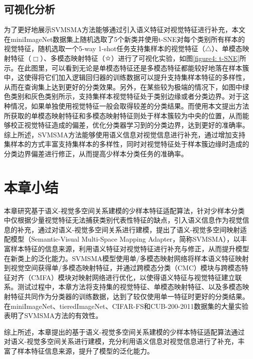 \subsection[\hspace{-2pt}可视化分析]{{\heiti{} \hspace{-8pt}可视化分析}}\label{section4: 可视化分析}

为了更好地展示SVMSMA方法能够通过引入语义特征对视觉特征进行补充，本文在miniImageNet数据集上随机选取了5个新类并使用t-SNE对每个类别所有样本的视觉特征，随机选取一个5-way 1-shot任务支持集样本的视觉特征（$\triangle$）、单模态映射特征（$\Box$）、多模态映射特征（$\hollowstar$）进行了可视化实验，如图\ref{figure4: t-SNE}所示。在此图里，可以看到无论是单模态特征还是多模态特征都能较好地落在样本簇中，这使得将它们加入逻辑回归器的训练数据可以提升支持集样本特征的多样性，从而在查询集上达到更好的分类效果。另外，在某些较为极端的情况下，如图中绿色类别和灰色类别所示，支持集样本视觉特征处于类别边缘或者分类边界。对于这种情况，如果单独使用视觉特征一般会取得较差的分类结果。而使用本文提出方法所获取的单模态映射特征和多模态映射特征则处于样本簇较为中央的位置，从而能够校正视觉特征造成的偏差，优化分类器学习到的分类边界，达到更好的准确率。综上所述，SVMSMA方法能够使用语义信息对视觉信息进行补充，通过增加支持集样本的方式丰富支持集样本的多样性，同时对视觉特征处于样本簇边缘时造成的分类边界偏差进行修正，从而提高少样本分类任务的准确率。


\section[\hspace{-2pt}本章小结]{{\heiti{} \hspace{-8pt}本章小结}}\label{section4: 本章小结}

本章研究基于语义-视觉多空间关系建模的少样本特征适配算法，针对少样本分类中仅根据少量视觉特征无法捕获类别代表性特征的缺点，引入语义信息作为视觉信息的补充，通过对语义-视觉多空间关系进行建模，提出了语义-视觉多空间映射适配模型（Semantic-Visual Multi-Space Mapping Adapter，简称SVMSMA），以丰富样本特征的信息来源，利用语义特征对视觉特征进行补充与修正，从而提升模型在新类上的泛化能力。SVMSMA模型使用单/多模态映射网络将样本语义特征映射到视觉空间获得单/多模态映射特征，并通过跨模态分类（CMC）模块与跨模态特征对齐（CMFA）模块对映射网络进行优化，以使得语义特征与视觉特征建立联系。测试过程中，本章方法将支持集的视觉特征、单模态映射特征、以及多模态映射特征共同作为分类器的训练数据，达到了较仅使用单一特征时更好的分类结果。在miniImageNet、tieredImageNet、CIFAR-FS和CUB-200-2011数据集的大量实验表明了SVMSMA方法的有效性。

综上所述，本章提出的基于语义-视觉多空间关系建模的少样本特征适配算法通过对语义-视觉多空间关系进行建模，充分利用语义信息对视觉信息进行了补充，丰富了样本特征信息来源，提升了模型的泛化能力。
